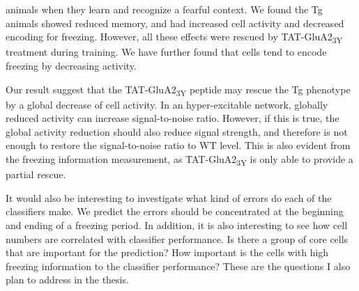 animals when they learn and recognize a fearful context. We found the Tg animals showed reduced memory, and had increased cell activity and decreased encoding for freezing. However, all these effects were rescued by TAT-GluA2\textsubscript{3Y} treatment during training. We have further found that cells tend to encode freezing by decreasing activity.

Our result suggest that the TAT-GluA2\textsubscript{3Y} peptide may rescue the Tg phenotype by a global decrease of cell activity. In an hyper-excitable network, globally reduced activity can increase signal-to-noise ratio. However, if this is true, the global activity reduction should also reduce signal strength, and therefore is not enough to restore the signal-to-noise ratio to WT level. This is also evident from the freezing information measurement, as TAT-GluA2\textsubscript{3Y} is only able to provide a partial rescue.

It would also be interesting to investigate what kind of errors do each of the classifiers make. We predict the errors should be concentrated at the beginning and ending of a freezing period. In addition, it is also interesting to see how cell numbers are correlated with classifier performance. Is there a group of core cells that are important for the prediction? How important is the cells with high freezing information to the classifier performance? These are the questions I also plan to address in the thesis.  
